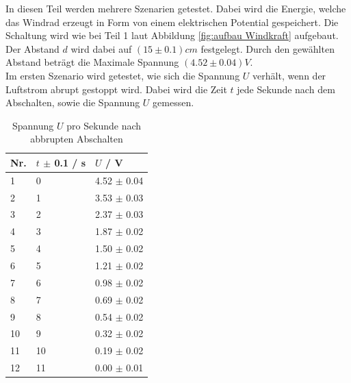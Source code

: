 \documentclass[12pt,a4paper,twoside]{article}
\begin{document}
\noindent
In diesen Teil werden mehrere Szenarien getestet. Dabei wird die Energie, welche das Windrad erzeugt in Form von einem elektrischen Potential gespeichert.
Die Schaltung wird wie bei Teil 1 laut Abbildung \ref{fig:aufbau Windkraft} aufgebaut. Der Abstand $d$ wird dabei auf $(15 \pm 0.1)cm$ festgelegt. 
Durch den gewählten Abstand beträgt die Maximale Spannung $(4.52 \pm 0.04)V$. 
\\
Im ersten Szenario wird getestet, wie sich die Spannung $U$ verhält, wenn der Luftstrom abrupt gestoppt wird. 
Dabei wird die Zeit $t$ jede Sekunde nach dem Abschalten, sowie die Spannung $U$ gemessen. 

\begin{table}[H]
    \centering
    \caption{Spannung $U$ pro Sekunde nach abbrupten Abschalten}
    \label{tab:Messdaten Windkraft abbrupt stop}
    \begin{tabular}{| l | l | l |}
        \hline
        Nr. & $t$ $\pm $ 0.1 / s & $U$ / V \\
        \hline
        1  & 0  & 4.52 $\pm$ 0.04   \\
        2  & 1  & 3.53 $\pm$ 0.03   \\
        3  & 2  & 2.37 $\pm$ 0.03   \\
        4  & 3  & 1.87 $\pm$ 0.02   \\
        5  & 4  & 1.50 $\pm$ 0.02   \\
        6  & 5  & 1.21 $\pm$ 0.02   \\
        7  & 6  & 0.98 $\pm$ 0.02   \\
        8  & 7  & 0.69 $\pm$ 0.02   \\
        9  & 8  & 0.54 $\pm$ 0.02   \\
        10 & 9  & 0.32 $\pm$ 0.02  \\
        11 & 10 & 0.19 $\pm$ 0.02   \\
        12 & 11 & 0.00 $\pm$ 0.01   \\
        \hline  
    \end{tabular}
\end{table}
\end{document}
